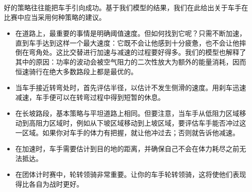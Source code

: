 \documentclass[11pt,a4paper]{ctexart}
\begin{document}
好的策略往往能把车手引向成功。基于我们模型的结果，我们在此给出关于车手在比赛中应当采用何种策略的建议。

\begin{itemize}
\item 在道路上，最重要的事情是明确阈值速度。但如何找到它呢？只需不断加速，直到车手达到这样一个最大速度：它既不会让他感到十分疲惫，也不会让他摔倒在弯角处。这比交替进行加速与减速的过程要好得多。我们的模型也解释了其中的原因：功率的波动会被空气阻力的二次性放大为额外的能量消耗，因而恒速骑行在绝大多数路段上都是最优的。
\item 当车手接近转弯处时，首先评估半径，以估计不发生侧滑的速度。用刹车迅速减速，车手便可以在转弯过程中得到短暂的休息。
\item 在长坡路段，基本策略与平坦道路上相同。但要注意，当车手从低阻力区域移动到高阻力区域时，例如从下坡区域移动到上坡区域，要评估车手能否冲过这一区域。如果你对车手的体力有把握，就让他冲过去；否则就告诉他减速。
\item 在加速时，车手需要估计到目的地的距离，并确保自己不会在体力耗尽之前无法抵达。
\item 在团体计时赛中，轮转领骑非常重要。让你的车手轮转领骑，这将使他们表现得比各自为战时更好。
\end{itemize}
\end{document}
